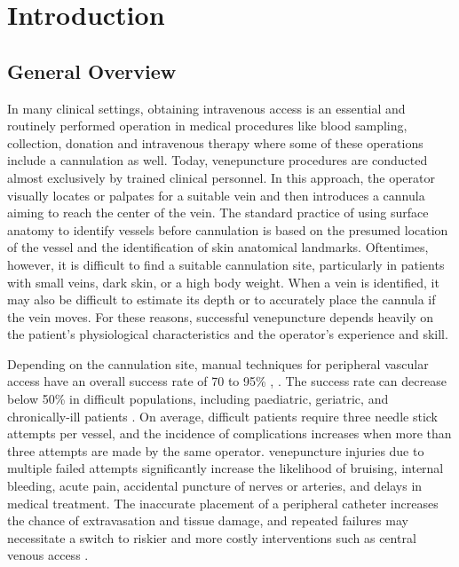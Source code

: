 
\chapter{Introduction}\label{chapter:introduction}

\section{General Overview} 

In many clinical settings, obtaining intravenous access is an essential and routinely performed operation in medical procedures like blood sampling, collection, donation and intravenous therapy where some of these operations include a cannulation as well.
Today, venepuncture procedures are conducted almost exclusively by trained clinical personnel. In this approach, the operator visually locates or palpates for a suitable vein and then introduces a cannula aiming to reach the center of the vein. The standard practice of using surface anatomy to identify vessels before cannulation is based on the presumed location of the vessel and the identification of skin anatomical landmarks. Oftentimes, however, it is difficult to find a suitable cannulation site, particularly in patients with small veins, dark skin, or a high body weight. When a vein is identified, it may also be difficult to estimate its depth or to accurately place the cannula if the vein moves. For these reasons, successful venepuncture depends heavily on the patient's physiological characteristics and the operator's experience and skill.

Depending on the cannulation site, manual techniques for peripheral vascular access have an overall success rate of 70 to 95\% \parencite{clinicalPredi}, \parencite{comlicationsVeni1}. The success rate can decrease below 50\% in difficult populations, including paediatric, geriatric, and chronically-ill patients \parencite{comlicationsVeni2} . On average, difficult
patients require three needle stick attempts per vessel, and the incidence of complications increases when more than three attempts are made by the same operator. venepuncture injuries due to multiple failed attempts significantly increase the likelihood of bruising, internal bleeding, acute pain, accidental puncture of nerves or arteries, and delays in medical treatment. The inaccurate placement of a peripheral catheter increases the chance of extravasation and tissue damage, and repeated failures may necessitate a switch to riskier and more costly interventions such as central venous access \parencite{clinicalPredi}.  


